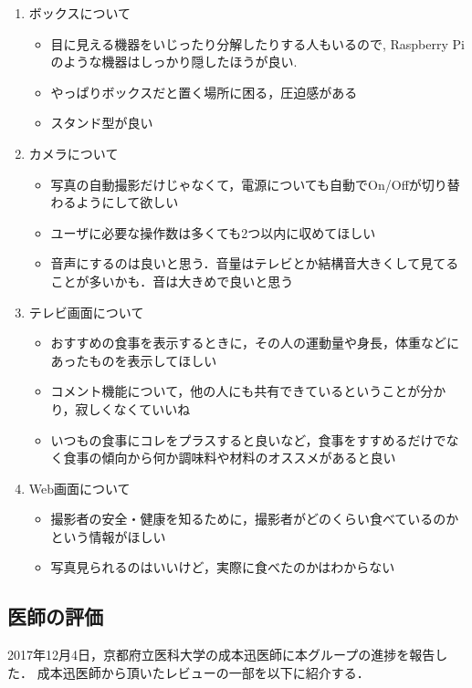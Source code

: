 \documentclass[../report]{subfiles}
\begin{document}
\begin{enumerate}
    \item[] ボックスについて
    \begin{itemize}
        \item 目に見える機器をいじったり分解したりする人もいるので, Raspberry Piのような機器はしっかり隠したほうが良い.
        \item やっぱりボックスだと置く場所に困る，圧迫感がある
        \item スタンド型が良い
    \end{itemize}

    \item[] カメラについて
    \begin{itemize}
        \item 写真の自動撮影だけじゃなくて，電源についても自動でOn/Offが切り替わるようにして欲しい
        \item ユーザに必要な操作数は多くても2つ以内に収めてほしい
        \item 音声にするのは良いと思う．音量はテレビとか結構音大きくして見てることが多いかも．音は大きめで良いと思う
    \end{itemize}

    \item[] テレビ画面について
    \begin{itemize}
        \item おすすめの食事を表示するときに，その人の運動量や身長，体重などにあったものを表示してほしい
        \item コメント機能について，他の人にも共有できているということが分かり，寂しくなくていいね
        \item いつもの食事にコレをプラスすると良いなど，食事をすすめるだけでなく食事の傾向から何か調味料や材料のオススメがあると良い
    \end{itemize}

    \item[] Web画面について
    \begin{itemize}
        \item 撮影者の安全・健康を知るために，撮影者がどのくらい食べているのかという情報がほしい
        \item 写真見られるのはいいけど，実際に食べたのかはわからない
    \end{itemize}
\end{enumerate}

\subsection{医師の評価}
2017年12月4日，京都府立医科大学の成本迅医師に本グループの進捗を報告した．
成本迅医師から頂いたレビューの一部を以下に紹介する．
\end{document}
